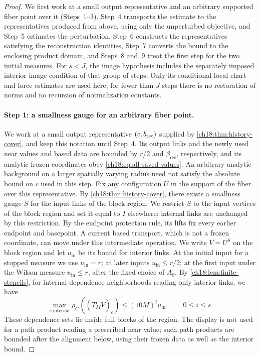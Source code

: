 \begin{proof}
We first work at a small output representative and an arbitrary supported fiber point over it (Steps~1--3). Step~4 transports the estimate to the representatives produced from above, using only the unperturbed objective, and Step~5 estimates the perturbation. Step~6 constructs the representatives satisfying the reconstruction identities, Step~7 converts the bound to the enclosing product domain, and Steps~8 and~9 treat the first step for the two initial measures. For $s<J$, the image hypothesis includes the separately imposed interior image condition of that group of steps. Only its conditional local chart and force estimates are used here; for fewer than $J$ steps there is no restoration of norms and no recursion of normalization constants.

\paragraph{Step 1: a smallness gauge for an arbitrary fiber point.}
We work at a small output representative $(c,b_{\mathrm{rec}})$ supplied by \cref{ch18:thm:history-cover}, and keep this notation until Step~4. Its output links and the newly used near values and based data are bounded by $r/2$ and $\beta_{\mathrm{rec}}$, respectively, and its analytic frozen coordinates obey \eqref{ch18:eq:all-saved-values}. An arbitrary analytic background on a larger spatially varying radius need not satisfy the absolute bound on $c$ used in this step. Fix any configuration $U$ in the support of the fiber over this representative. By \cref{ch18:thm:history-cover}, there exists a smallness gauge $S$ for the input links of the block region. We restrict $S$ to the input vertices of the block region and set it equal to $I$ elsewhere; internal links are unchanged by this restriction. By the endpoint protection rule, its lifts fix every earlier endpoint and basepoint. A current based transport, which is not a frozen coordinate, can move under this intermediate operation. We write $V=U^S$ on the block region and let $u_{\mathrm{in}}$ be its bound for interior links. At the initial input for a stopped measure we use $u_{\mathrm{in}}=r$; at later inputs $u_{\mathrm{in}}\le r/2$; at the first input under the Wilson measure $u_{\mathrm{in}}\le r$, after the fixed choice of $A_8$. By \cref{ch18:lem:finite-stencils}, for internal dependence neighborhoods reading only interior links, we have
\begin{equation}\label{ch18:eq:small-witness-iterates}
 \max_{e\ \mathrm{internal}}\rho_G((T_M^iV)_e)
                 \le (10M)^i u_{\mathrm{in}},\qquad 0\le i\le s.
\end{equation}
These dependence sets lie inside full blocks of the region. The display is not used for a path product reading a prescribed near value; such path products are bounded after the alignment below, using their frozen data as well as the interior bound.


\end{proof}
